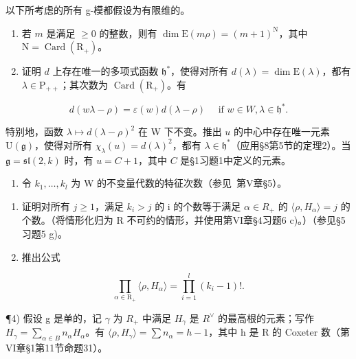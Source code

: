 
以下所考虑的所有 g-模都假设为有限维的。

\begin{enumerate}
\def\labelenumi{\arabic{enumi})}
\item
  若 \(m\) 是满足 \(\geq 0\) 的整数，则有 \(\dim \mathrm{E}(m\rho) = (m + 1)^{\mathrm{N}}\)，其中 \(\mathrm{N} = \operatorname{Card}(\mathrm{R}_{+})\)。
\item
  证明 \(d\) 上存在唯一的多项式函数 \(\mathfrak{h}^*\)，使得对所有 \(d(\lambda) = \dim \mathrm{E}(\lambda)\)，都有 \(\lambda \in \mathrm{P}_{++}\)；其次数为 \(\operatorname{Card}(\mathrm{R}_+)\)。有
\end{enumerate}

\[
d (w \lambda - \rho) = \varepsilon (w) d (\lambda - \rho) \quad \text { if } w \in W, \lambda \in \mathfrak {h} ^ {*}.
\]

特别地，函数 \(\lambda \mapsto d(\lambda - \rho)^2\) 在 W 下不变。推出 \(u\) 的中心中存在唯一元素 \(\mathrm{U}(\mathfrak{g})\)，使得对所有 \(\chi_{\lambda}(u) = d(\lambda)^2\)，都有 \(\lambda \in \mathfrak{h}^*\)（应用§8第5节的定理2）。当 \(\mathfrak{g} = \mathfrak{sl}(2,k)\) 时，有 \(u = C + 1\)，其中 \(C\) 是§1习题1中定义的元素。

\begin{enumerate}
\def\labelenumi{\arabic{enumi})}
\setcounter{enumi}{2}
\tightlist
\item
  令 \(k_{1}, \ldots, k_{l}\) 为 W 的不变量代数的特征次数（参见~第V章§5）。
\end{enumerate}

\begin{enumerate}
\def\labelenumi{\alph{enumi})}
\item
  证明对所有 \(j \geq 1\)，满足 \(k_{i} > j\) 的 i 的个数等于满足 \(\alpha \in R_{+}\) 的 \(\langle \rho, H_{\alpha} \rangle = j\) 的个数。（将情形化归为 R 不可约的情形，并使用第VI章§4习题6 c)。）（参见§5习题5 g)。
\item
  推出公式
\end{enumerate}

\[
\prod_ {\alpha \in \mathrm{R} _ {+}} \langle \rho , H _ {\alpha} \rangle = \prod_ {i = 1} ^ {l} (k _ {i} - 1)!.
\]

¶4) 假设 g 是单的，记 \(\gamma\) 为 \(R_{+}\) 中满足 \(H_{\gamma}\) 是 \(R^{\vee}\) 的最高根的元素；写作 \(H_{\gamma} = \sum_{\alpha \in B} n_{\alpha} H_{\alpha}\)。有 \(\langle \rho, H_{\gamma} \rangle = \sum n_{\alpha} = h - 1\)，其中 h 是 R 的 Coxeter 数（第VI章§1第11节命题31）。

